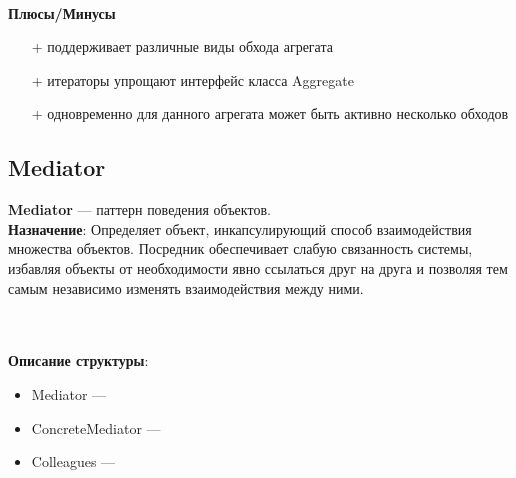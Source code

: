 \documentclass[a3paper,11pt]{report}
\def \boxSize {7cm}
\renewcommand{\umldrawcolor}{black}
\renewcommand{\unidirectionalAssociation}[4]{
	\draw [umlcd style, ->, umlcdNS] (#1) -- (#4)
	node[near end, above]{#2}
	node[near end, below]{#3};
}
\begin{document}
\textbf{\\Плюсы/Минусы}
\begin{itemize}
\item [+] поддерживает различные виды обхода агрегата
\item [+] итераторы упрощают интерфейс класса Aggregate
\item [+] одновременно для данного агрегата может быть активно несколько обходов
\end{itemize}


\newpage
\subsection{Mediator}

\large\textbf{Mediator} --- паттерн поведения объектов.
\\
\large\textbf{Назначение}: Определяет объект, инкапсулирующий способ взаимодействия множества
объектов. Посредник обеспечивает слабую связанность системы, избавляя объекты от необходимости явно ссылаться друг на друга и позволяя тем самым независимо изменять взаимодействия между ними. 
\\

\\\\
\textbf{Описание структуры}:
\begin{itemize}
\item Mediator ---
\item ConcreteMediator --- 
\item Colleagues ---
\end{itemize}
\end{document}
